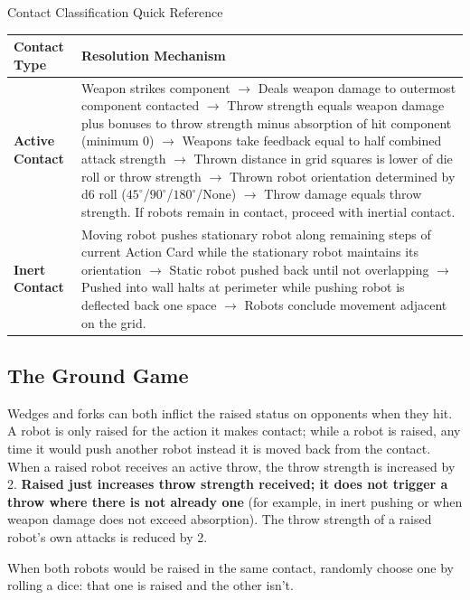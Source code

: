 \documentclass[11pt,a4paper]{article}
\newcommand{\inlineIcon}[1]{\raisebox{-0.22ex}{\resizebox{!}{1.15em}{#1}}}
\begin{document}
\begin{summarybox}{Contact Classification Quick Reference}
\begin{tabularx}{\textwidth}{l X}
  \textbf{Contact Type} & \textbf{Resolution Mechanism} \\
  \midrule
  \textbf{Active Contact} & Weapon strikes component $\rightarrow$ Deals weapon damage \inlineIcon{\resourceW} to outermost component contacted $\rightarrow$ Throw strength equals weapon damage \inlineIcon{\resourceW} plus bonuses to throw strength minus absorption of hit component (minimum 0) $\rightarrow$ Weapons take feedback equal to half combined attack strength $\rightarrow$ Thrown distance in grid squares is lower of die roll or throw strength $\rightarrow$ Thrown robot orientation determined by d6 roll ($45^\circ$/$90^\circ$/$180^\circ$/None) $\rightarrow$ Throw damage equals throw strength. If robots remain in contact, proceed with inertial contact. \\
  \addlinespace[3pt]
  \textbf{Inert Contact} & Moving robot pushes stationary robot along remaining steps of current Action Card while the stationary robot maintains its orientation $\rightarrow$ Static robot pushed back until not overlapping $\rightarrow$ Pushed into wall halts at perimeter while pushing robot is deflected back one space $\rightarrow$ Robots conclude movement adjacent on the grid. \\
\end{tabularx}
\end{summarybox}

\subsection{The Ground Game}

Wedges and forks can both inflict the raised status on opponents when they hit. A robot is only raised for the action it makes contact; while a robot is raised, any time it would push another robot instead it is moved back from the contact. When a raised robot receives an active throw, the throw strength is increased by 2. \textbf{Raised just increases throw strength received; it does not trigger a throw where there is not already one} (for example, in inert pushing or when weapon damage does not exceed absorption). The throw strength of a raised robot's own attacks is reduced by 2.

When both robots would be raised in the same contact, randomly choose one by rolling a dice: that one is raised and the other isn't.
\end{document}
